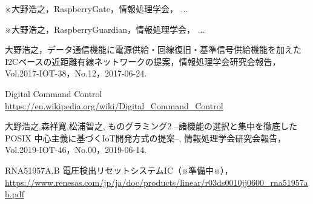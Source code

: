 {\begin{acknowledgment}
\end{acknowledgment}




\vspace{-0.5zh}
\begin{thebibliography}{2}


  ※大野浩之，RaspberryGate，情報処理学会， ...

  ※大野浩之，RaspberryGuardian，情報処理学会， ...

  大野浩之，データ通信機能に電源供給・回線復旧・基準信号供給機能を加えたI2Cベースの近距離有線ネットワークの提案，情報処理学会研究会報告，Vol.2017-IOT-38，No.12，2017-06-24.

Digital Command Control
\url{https://en.wikipedia.org/wiki/Digital_Command_Control}


  大野浩之,森祥寛,松浦智之,  ものグラミング2 --諸機能の選択と集中を徹底したPOSIX 中心主義に基づくIoT開発方式の提案--, 情報処理学会研究会報告，Vol.2019-IOT-46，No.00，2019-06-14.

  RNA51957A,B 電圧検出リセットシステムIC（※準備中※），
  \url{https://www.renesas.com/jp/ja/doc/products/linear/r03ds0010jj0600_rna51957ab.pdf}


\end{thebibliography}}
